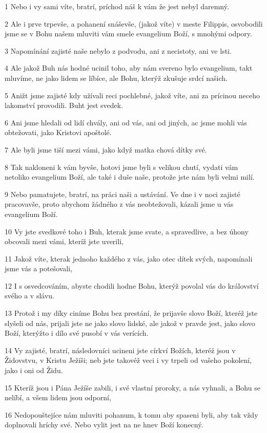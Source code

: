 \par 1 Nebo i vy sami víte, bratrí, príchod náš k vám že jest nebyl daremný.
\par 2 Ale i prve trpevše, a pohanení snáševše, (jakož víte) v meste Filippis, osvobodili jsme se v Bohu našem mluviti vám smele evangelium Boží, s mnohými odpory.
\par 3 Napomínání zajisté naše nebylo z podvodu, ani z necistoty, ani ve lsti.
\par 4 Ale jakož Buh nás hodné ucinil toho, aby nám svereno bylo evangelium, takt mluvíme, ne jako lidem se líbíce, ale Bohu, kterýž zkušuje srdcí našich.
\par 5 Anižt jsme zajisté kdy užívali reci pochlebné, jakož víte, ani za prícinou neceho lakomství provodili. Buht jest svedek.
\par 6 Ani jsme hledali od lidí chvály, ani od vás, ani od jiných, ac jsme mohli vás obtežovati, jako Kristovi apoštolé.
\par 7 Ale byli jsme tiší mezi vámi, jako když matka chová dítky své.
\par 8 Tak nakloneni k vám byvše, hotovi jsme byli s velikou chutí, vydati vám netoliko evangelium Boží, ale také i duše naše, protože jste nám byli velmi milí.
\par 9 Nebo pamatujete, bratrí, na práci naši a ustávání. Ve dne i v noci zajisté pracovavše, proto abychom žádného z vás neobtežovali, kázali jsme u vás evangelium Boží.
\par 10 Vy jste svedkové toho i Buh, kterak jsme svate, a spravedlive, a bez úhony obcovali mezi vámi, kteríž jste uverili,
\par 11 Jakož víte, kterak jednoho každého z vás, jako otec dítek svých, napomínali jsme vás a potešovali,
\par 12 I s osvedcováním, abyste chodili hodne Bohu, kterýž povolal vás do království svého a v slávu.
\par 13 Protož i my díky ciníme Bohu bez prestání, že prijavše slovo Boží, kteréž jste slyšeli od nás, prijali jste ne jako slovo lidské, ale jakož v pravde jest, jako slovo Boží, kterýžto i dílo své pusobí v vás verících.
\par 14 Vy zajisté, bratrí, následovníci ucineni jste církví Božích, kteréž jsou v Židovstvu, v Kristu Ježíši; neb jste takovéž veci i vy trpeli od vašeho pokolení, jako i oni od Židu.
\par 15 Kteríž jsou i Pána Ježíše zabili, i své vlastní proroky, a nás vyhnali, a Bohu se nelíbí, a všem lidem jsou odporní,
\par 16 Nedopouštejíce nám mluviti pohanum, k tomu aby spaseni byli, aby tak vždy doplnovali hríchy své. Nebo vylit jest na ne hnev Boží konecný.
